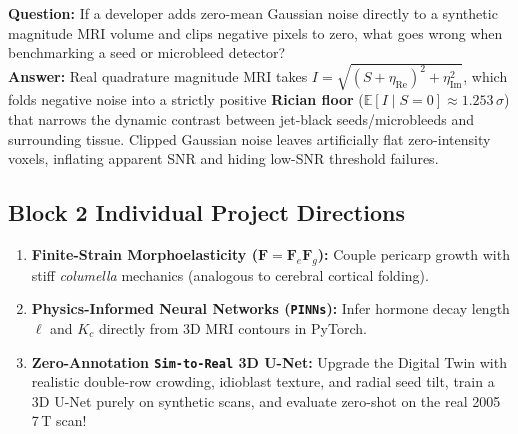 \documentclass[10.5pt,a4paper]{article}
\begin{document}
\begin{qabox}
\textbf{Question:} If a developer adds zero-mean Gaussian noise directly to a synthetic magnitude MRI volume and clips negative pixels to zero, what goes wrong when benchmarking a seed or microbleed detector?\\[2pt]
\textbf{Answer:} Real quadrature magnitude MRI takes $I = \sqrt{(S + \eta_{\text{Re}})^2 + \eta_{\text{Im}}^2}$, which folds negative noise into a strictly positive \textbf{Rician floor} ($\mathbb{E}[I\mid S=0] \approx 1.253\,\sigma$) that narrows the dynamic contrast between jet-black seeds/microbleeds and surrounding tissue. Clipped Gaussian noise leaves artificially flat zero-intensity voxels, inflating apparent SNR and hiding low-SNR threshold failures.
\end{qabox}

\subsection{Block 2 Individual Project Directions}
\begin{enumerate}
    \item \textbf{Finite-Strain Morphoelasticity ($\mathbf{F} = \mathbf{F}_e\mathbf{F}_g$):} Couple pericarp growth with stiff \emph{columella} mechanics (analogous to cerebral cortical folding).
    \item \textbf{Physics-Informed Neural Networks (\texttt{PINNs}):} Infer hormone decay length $\ell$ and $K_c$ directly from 3D MRI contours in PyTorch.
    \item \textbf{Zero-Annotation \texttt{Sim-to-Real} 3D U-Net:} Upgrade the Digital Twin with realistic double-row crowding, idioblast texture, and radial seed tilt, train a 3D U-Net purely on synthetic scans, and evaluate zero-shot on the real 2005 7\,T scan!
\end{enumerate}
\end{document}
